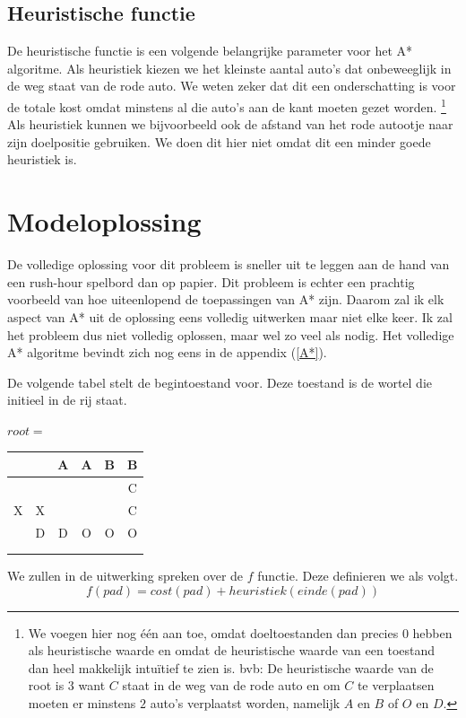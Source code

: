 \documentclass[alternative-exam.tex]{subfiles}
\begin{document}
\subsection{Heuristische functie} De heuristische functie is een volgende belangrijke parameter voor het A* algoritme. Als heuristiek kiezen we het kleinste aantal auto's dat onbeweeglijk in de weg staat van de rode auto. We weten zeker dat dit een onderschatting is voor de totale kost omdat minstens al die auto's aan de kant moeten gezet worden. \footnote{We voegen hier nog \'e\'en aan toe, omdat doeltoestanden dan precies $0$ hebben als heuristische waarde en omdat de heuristische waarde van een toestand dan heel makkelijk intu\"itief te zien is. bvb: De heuristische waarde van de root is $3$ want $C$ staat in de weg van de rode auto en om $C$ te verplaatsen moeten er minstens $2$ auto's verplaatst worden, namelijk $A$ en $B$ of $O$ en $D$.}
Als heuristiek kunnen we bijvoorbeeld ook de afstand van het rode autootje naar zijn doelpositie gebruiken. We doen dit hier niet omdat dit een minder goede heuristiek is.

\section{Modeloplossing}
De volledige oplossing voor dit probleem is sneller uit te leggen aan de hand van een rush-hour spelbord dan op papier. Dit probleem is echter een prachtig voorbeeld van hoe uiteenlopend de toepassingen van A* zijn. Daarom zal ik elk aspect van A* uit de oplossing eens volledig uitwerken maar niet elke keer. Ik zal het probleem dus niet volledig oplossen, maar wel zo veel als nodig. Het volledige A* algoritme bevindt zich nog eens in de appendix (\ref{A*}).

De volgende tabel stelt de begintoestand voor. Deze toestand is de wortel die initieel in de rij staat.
\begin{center}
$root = $
\begin{tabular}{| c | c | c | c | c | c |}
\hline
   &   & A & A & B & B \\ \hline
   &   &   &   &   & C \\ \hline
 X & X &   &   &   & C \\ \hline
   & D & D & O & O & O \\ \hline
   &   &   &   &   &   \\ \hline
   &   &   &   &   &   \\
\hline
\end{tabular}
\end{center}
We zullen in de uitwerking spreken over de $f$ functie. Deze definieren we als volgt.
\[
f(pad) = cost(pad) + heuristiek(einde(pad))
\]
\end{document}
